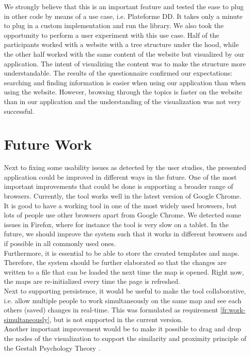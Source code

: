 We strongly believe that this is an important feature and tested the ease to plug in other code by means of a use case, i.e. Plateforme DD. It takes only a minute to plug in a custom implementation and run the library. We also took the opportunity to perform a user experiment with this use case. Half of the participants worked with a website with a tree structure under the hood, while the other half worked with the same content of the website but visualized by our application. The intent of visualizing the content was to make the structure more understandable. The results of the questionnaire confirmed our expectations: searching and finding information is easier when using our application than when using the website. However, browsing through the topics is faster on the website than in our application and the understanding of the visualization was not very successful.


\section{Future Work}\label{sec:future-work}
Next to fixing some usability issues as detected by the user studies, the presented application could be improved in different ways in the future. One of the most important improvements that could be done is supporting a broader range of browsers. Currently, the tool works well in the latest version of Google Chrome. It is good to have a working tool in one of the most widely used browsers, but lots of people use other browsers apart from Google Chrome. We detected some issues in Firefox, where for instance the tool is very slow on a tablet. In the future, we should improve the system such that it works in different browsers and if possible in all commonly used ones.\\

Furthermore, it is essential to be able to store the created templates and maps. Therefore, the system should be further elaborated so that the changes are written to a file that can be loaded the next time the map is opened. Right now, the maps are re-initialized every time the page is refreshed.\\

Next to supporting persistence, it would be useful to make the tool collaborative, i.e. allow multiple people to work simultaneously on the same map and see each others (saved) changes in real-time. This was formulated as requirement \ref{fr:work-simultaneously}, but is not supported in the current version.\\

Another important improvement would be to make it possible to drag and drop the nodes of the visualization to support the similarity and proximity principle of the Gestalt Psychology Theory \citep{koffka2013principles}.
